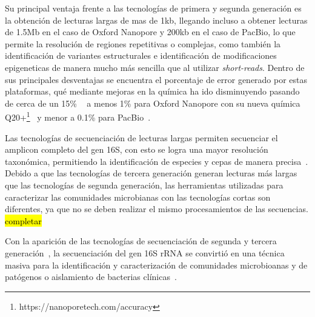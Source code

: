 Su principal ventaja frente a las tecnologías de primera y segunda generación es la obtención de lecturas largas de mas de 1kb, llegando incluso a obtener lecturas de 1.5Mb en el caso de Oxford Nanopore y 200kb en el caso de PacBio, lo que permite la resolución de regiones repetitivas o complejas, como también la identificación de variantes estructurales e identificación de modificaciones epigeneticas de manera mucho más sencilla que al utilizar \textit{short-reads}. 
Dentro de sus principales desventajas se encuentra el porcentaje de error generado por estas plataformas, qué mediante mejoras en la química ha ido disminuyendo pasando de cerca de un 15\% ~\cite{deamer2016three} a menos 1\% para Oxford Nanopore con su nueva química Q20+\footnote{https://nanoporetech.com/accuracy}~\cite{cuber2023comparing} y menor a 0.1\% para PacBio~\cite{cuber2023comparing}.

Las tecnologías de secuenciación de lecturas largas permiten secuenciar el amplicon completo del gen 16S, con esto se logra una mayor resolución taxonómica, permitiendo la identificación de especies y cepas de manera precisa~\cite{szoboszlay2023nanopore}. 
Debido a que las tecnologías de tercera generación generan lecturas más largas que las tecnologías de segunda generación, las herramientas utilizadas para caracterizar las comunidades microbianas con las tecnologías cortas son diferentes, ya que no se deben realizar el mismo procesamientos de las secuencias. \hl{completar}

Con la aparición de las tecnologías de secuenciación de segunda y tercera generación~\cite{janda200716s,pollock2018madness}, la secuenciación del gen 16S rRNA se convirtió en  una técnica masiva para la identificación y caracterización de comunidades microbioanas y de patógenos o aislamiento de bacterias clínicas~\cite{patel200116s}.




